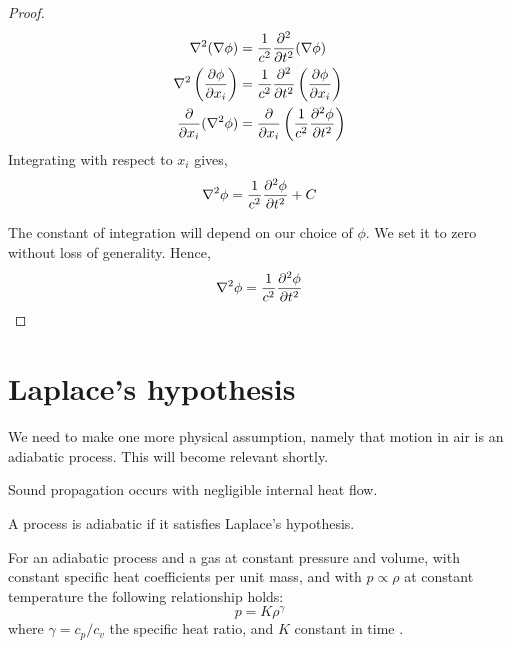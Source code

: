     \begin{proof}
        \begin{align*}
            \nabla^2 (\nabla \phi)
            &= \frac{1}{c^2} \frac{\partial ^2}{\partial t^2} (\nabla \phi) \\
            \nabla^2 \left(\frac{\partial \phi}{\partial x_i}\right)
            &= \frac{1}{c^2} \frac{\partial ^2}{\partial t^2} \left(\frac{\partial \phi}{\partial x_i}\right) \\
            \frac{\partial }{\partial x_i} (\nabla^2 \phi )
            &= \frac{\partial }{\partial x_i} \left(\frac{1}{c^2} \frac{\partial ^2 \phi}{\partial t^2} \right)
        \end{align*}
    Integrating with respect to $x_i$ gives,
        \begin{equation*}
            \nabla^2 \phi = \frac{1}{c^2} \frac{\partial ^2 \phi}{\partial t^2} + C
        \end{equation*}\par
    The constant of integration will depend on our choice of $\phi$. We set it to zero without loss of generality. Hence,
        \begin{equation}\label{eq:lin_wave_phi}
            \nabla^2 \phi = \frac{1}{c^2} \frac{\partial ^2 \phi}{\partial t^2}
        \end{equation}
    \end{proof}
%
\section{Laplace's hypothesis}\label{ss:laplace_hypothesis}
We need to make one more physical assumption, namely that motion in air is an adiabatic process. This will become relevant shortly.
    \begin{hypothesis}
        Sound propagation occurs with negligible internal heat flow.
    \end{hypothesis}
    \begin{defn}\label{defn:adiabatic}
        A process is adiabatic if it satisfies Laplace's hypothesis.
    \end{defn} \par
%
For an adiabatic process and a gas at constant pressure and volume, with constant specific heat coefficients per unit mass, and with $p \propto \rho$ at constant temperature the following relationship holds:
    \begin{equation}\label{eq:adiabatic_condition}
        p = K \rho ^ \gamma
    \end{equation}
where $\gamma = c_p/c_v$ the specific heat ratio, and $K$ constant in time \parencite[$\S$1.4.1]{pierce19acoustics}.
%
